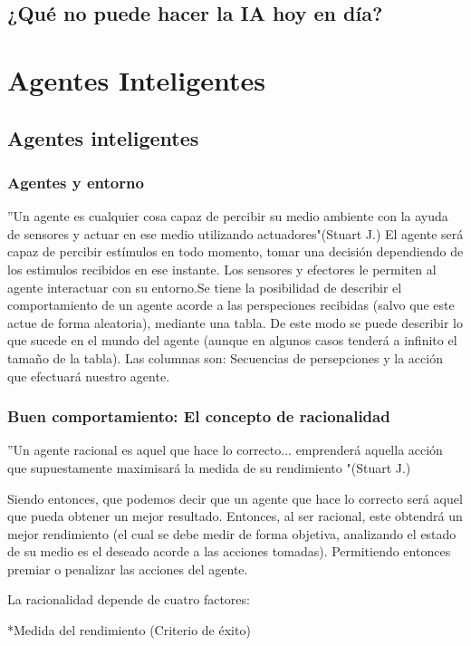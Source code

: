 \documentclass{article}
\begin{document}
\subsection{¿Qué no puede hacer la IA hoy en día?}


\section{Agentes Inteligentes}
\subsection{Agentes inteligentes}
\subsubsection{Agentes y  entorno}
''Un agente es cualquier cosa capaz de percibir su medio ambiente con la ayuda de sensores y actuar en ese medio utilizando actuadores"(Stuart J.)
El agente será capaz de percibir estímulos en todo momento, tomar una decisión dependiendo de los estimulos recibidos en ese instante. Los sensores y efectores le permiten al agente interactuar con su entorno.Se tiene la posibilidad de describir el comportamiento de un agente acorde a las perspeciones recibidas (salvo que este actue de forma aleatoria), mediante una tabla. De este modo se puede describir lo que sucede en el mundo del agente (aunque en algunos casos tenderá a infinito el tamaño de la tabla). Las columnas son: Secuencias de persepciones y la acción que efectuará nuestro agente.

\subsubsection{Buen comportamiento: El concepto de racionalidad}

''Un agente racional es aquel que hace lo correcto... emprenderá aquella acción que supuestamente maximisará la medida de su rendimiento "(Stuart J.)


Siendo entonces, que podemos decir que un agente que hace lo correcto será aquel que pueda obtener un mejor resultado. Entonces, al ser racional, este obtendrá un mejor rendimiento (el cual se debe medir de forma objetiva, analizando el estado de su medio es el deseado acorde a las acciones tomadas). Permitiendo entonces premiar o penalizar las acciones del agente.

La racionalidad depende de cuatro factores:


*Medida del rendimiento (Criterio de éxito)
\end{document}
